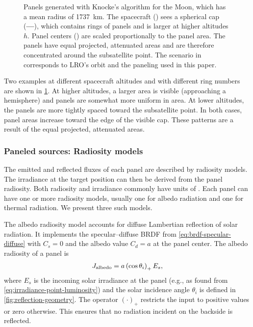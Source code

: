 \begin{figure}[t]
   \caption{Panels generated with Knocke's algorithm for the Moon, which has a mean radius of \qty{1737}{\km}. The spacecraft (\textcolor{mpl-pink}{}) sees a spherical cap (\textcolor{mpl-red}{\textbf{---}}), which contains rings of panels and is larger at higher altitudes $h$. Panel centers (\textcolor{mpl-lightblue}{}) are scaled proportionally to the panel area. The panels have equal projected, attenuated areas and are therefore concentrated around the subsatellite point. The scenario in \protect{} corresponds to LRO's orbit and the paneling used in this paper.}
   \label{fig:general-knocke-paneling}
\end{figure}

Two examples at different spacecraft altitudes and with different ring numbers are shown in \cref{fig:general-knocke-paneling}. At higher altitudes, a larger area is visible (approaching a hemisphere) and panels are somewhat more uniform in area. At lower altitudes, the panels are more tightly spaced toward the subsatellite point. In both cases, panel areas increase toward the edge of the visible cap. These patterns are a result of the equal projected, attenuated areas.

\subsubsection{Paneled sources: Radiosity models}
The emitted and reflected fluxes of each panel are described by radiosity models. The irradiance at the target position can then be derived from the panel radiosity. Both radiosity and irradiance commonly have units of \unit{\irr}. Each panel can have one or more radiosity models, usually one for albedo radiation and one for thermal radiation. We present three such models.

The albedo radiosity model accounts for diffuse Lambertian reflection of solar radiation. It implements the specular--diffuse \gls{BRDF} from \cref{eq:brdf-specular-diffuse} with $C_s = 0$ and the albedo value $C_d = a$ at the panel center. The albedo radiosity of a panel is~\cite{Knocke1988}
\begin{align}
    \label{eq:radiosity-albedo}
    J_\textnormal{albedo} = a \left(\cos\theta_i\right)_+ E_s,
\end{align}
where $E_s$ is the incoming solar irradiance at the panel (e.g., as found from \cref{eq:irradiance-point-luminosity}) and the solar incidence angle $\theta_i$ is defined in \cref{fig:reflection-geometry}. The operator $(\cdot)_+$ restricts the input to positive values or zero otherwise. This ensures that no radiation incident on the backside is reflected.


